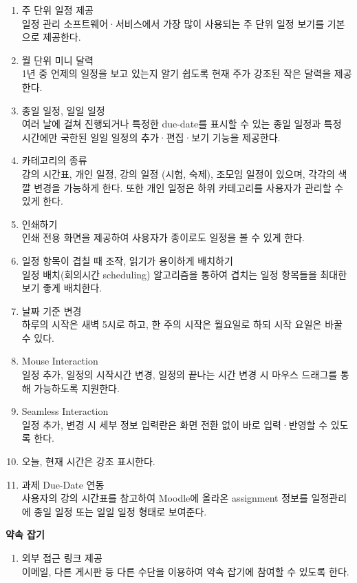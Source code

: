 \documentclass[a4paper,titlepage]{article}
\begin{document}
\begin{funcreq}
\begin{enumerate}
		\item 주 단위 일정 제공\\
		일정 관리 소프트웨어·서비스에서 가장 많이 사용되는 주 단위 일정 보기를 기본으로 제공한다. 
		\item 월 단위 미니 달력\\
		1년 중 언제의 일정을 보고 있는지 알기 쉽도록 현재 주가 강조된 작은 달력을 제공한다.
		\item 종일 일정, 일일 일정\\
		여러 날에 걸쳐 진행되거나 특정한 due-date를 표시할 수 있는 종일 일정과 특정 시간에만 국한된 일일 일정의 추가·편집·보기 기능을 제공한다.
		\item 카테고리의 종류\\
		강의 시간표, 개인 일정, 강의 일정 (시험, 숙제), 조모임 일정이 있으며, 각각의 색깔 변경을 가능하게 한다. 또한 개인 일정은 하위 카테고리를 사용자가 관리할 수 있게 한다.
		\item 인쇄하기\\
		인쇄 전용 화면을 제공하여 사용자가 종이로도 일정을 볼 수 있게 한다.
		\item 일정 항목이 겹칠 때 조작, 읽기가 용이하게 배치하기\\
		일정 배치(회의시간 scheduling) 알고리즘을 통하여 겹치는 일정 항목들을 최대한 보기 좋게 배치한다.
		\item 날짜 기준 변경\\
		하루의 시작은 새벽 5시로 하고, 한 주의 시작은 월요일로 하되 시작 요일은 바꿀 수 있다.
		\item Mouse Interaction\\
		일정 추가, 일정의 시작시간 변경, 일정의 끝나는 시간 변경 시 마우스 드래그를 통해 가능하도록 지원한다.
		\item Seamless Interaction\\
		일정 추가, 변경 시 세부 정보 입력란은 화면 전환 없이 바로 입력·반영할 수 있도록 한다.
		\item 오늘, 현재 시간은 강조 표시한다.
		\item 과제 Due-Date 연동\\
		사용자의 강의 시간표를 참고하여 Moodle에 올라온 assignment 정보를 일정관리에 종일 일정 또는 일일 일정 형태로 보여준다. 
	\end{enumerate}
	\item\textbf{약속 잡기}
	\begin{enumerate}
		\item 외부 접근 링크 제공\\
		이메일, 다른 게시판 등 다른 수단을 이용하여 약속 잡기에 참여할 수 있도록 한다.

\end{enumerate}
\end{funcreq}
\end{document}
